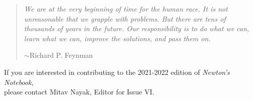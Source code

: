\documentclass[12pt]{article}
\theoremstyle{definition}
\begin{document}
\begin{quotation}
\textit{We are at the very beginning of time for the human race. It is not unreasonable that we grapple with problems. But there are tens of thousands of years in the future. Our responsibility is to do what we can, learn what we can, improve the solutions, and pass them on.}
	\begin{flushright}
$\sim$Richard P. Feynman
	\end{flushright}
\end{quotation}

\begin{center}
If you are interested in contributing to the 2021-2022 edition of \textit{Newton’s Notebook},\\ 
please contact Mitav Nayak, Editor for Issue VI.
\end{center}

\end{document}
